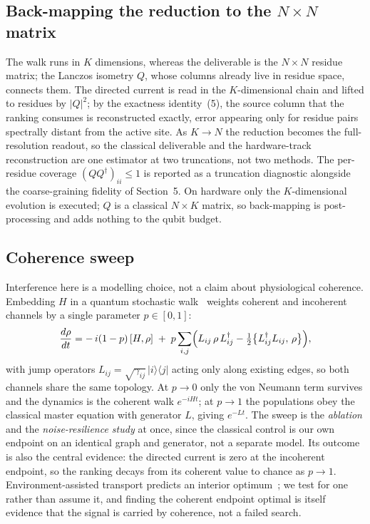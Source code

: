 \documentclass[10pt,a4paper]{article}
\begin{document}
\subsection{Back-mapping the reduction to the $N\times N$ matrix}

The walk runs in $K$ dimensions, whereas the deliverable is the $N\times N$ residue matrix; the
Lanczos isometry $Q$, whose columns already live in residue space, connects them. The directed
current is read in the $K$-dimensional chain and lifted to residues by $|Q|^{2}$; by the exactness
identity~(5), the source column that the ranking consumes is reconstructed exactly, error appearing
only for residue pairs spectrally distant from the active site. As $K \to N$ the reduction becomes the
full-resolution readout, so the classical deliverable and the hardware-track reconstruction are one
estimator at two truncations, not two methods. The per-residue coverage $(Q Q^{\dagger})_{ii}\le 1$
is reported as a truncation diagnostic alongside the coarse-graining fidelity of Section~5. On
hardware only the $K$-dimensional evolution is executed; $Q$ is a classical $N\times K$ matrix, so
back-mapping is post-processing and adds nothing to the qubit budget.

\subsection{Coherence sweep}

Interference here is a modelling choice, not a claim about physiological coherence. Embedding $H$ in
a quantum stochastic walk~\cite{whitfield2010} weights coherent and incoherent channels by a single
parameter $p \in [0,1]$:
\begin{equation}
\frac{d\rho}{dt}
 = -\,i(1-p)\,[H,\rho]
 \;+\; p\sum_{i,j}\Bigl(L_{ij}\,\rho\,L_{ij}^{\dagger}
        - \tfrac{1}{2}\bigl\{L_{ij}^{\dagger}L_{ij},\,\rho\bigr\}\Bigr),
\end{equation}
with jump operators $L_{ij} = \sqrt{\gamma_{ij}}\,|i\rangle\langle j|$ acting only along existing
edges, so both channels share the same topology. At $p \to 0$ only the von Neumann term survives and
the dynamics is the coherent walk $e^{-iHt}$; at $p \to 1$ the populations obey the classical master
equation with generator $L$, giving $e^{-Lt}$. The sweep is the \emph{ablation} and the
\emph{noise-resilience study} at once, since the classical control is our own endpoint on an
identical graph and generator, not a separate model. Its outcome is also the central evidence: the
directed current is zero at the incoherent endpoint, so the ranking decays from its coherent value to
chance as $p \to 1$. Environment-assisted transport predicts an interior optimum~\cite{rebentrost2009};
we test for one rather than assume it, and finding the coherent endpoint optimal is itself evidence
that the signal is carried by coherence, not a failed search.
\end{document}
